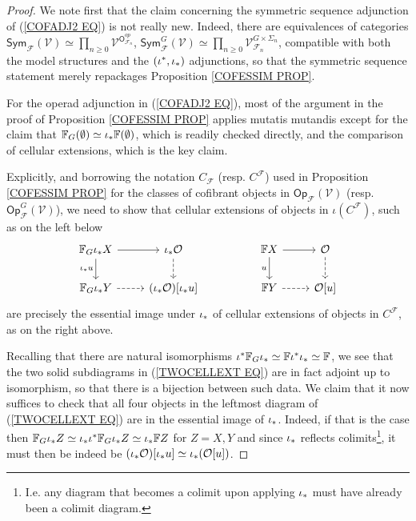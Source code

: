 \documentclass[a4paper,10pt]{article}%
\begin{document}
\begin{proof}
We note first that the claim concerning the symmetric sequence adjunction of (\ref{COFADJ2 EQ})
is not really new. Indeed, there are equivalences of categories
$
\mathsf{Sym}_{\mathcal{F}}(\mathcal{V})
\simeq \prod_{n \geq 0}
\mathcal{V}^{\mathsf{O}^{op}_{\mathcal{F}_n}}
$,
$
\mathsf{Sym}^G_{\mathcal{F}}(\mathcal{V})
\simeq \prod_{n \geq 0}
\mathcal{V}_{\mathcal{F}_n}^{G \times \Sigma_n}
$,
compatible with both the model structures and the $(\iota^{\**},\iota_{\**})$ adjunctions, 
so that the symmetric sequence statement merely repackages 
Proposition \ref{COFESSIM PROP}.

For the operad adjunction in (\ref{COFADJ2 EQ}),
most of the argument in the proof of
Proposition \ref{COFESSIM PROP}
applies mutatis mutandis
except for the claim that 
$\mathbb{F}_G (\emptyset) \simeq \iota_{\**} \mathbb{F} (\emptyset)$, which is readily checked directly, 
and the comparison of cellular extensions,
which is the key claim.


Explicitly, and borrowing the notation
$C_{\mathcal{F}}$ (resp. $C^{\mathcal{F}}$) used in Proposition \ref{COFESSIM PROP} for the 
classes of cofibrant objects in 
$\mathsf{Op}_{\mathcal{F}}(\mathcal{V})$ 
(resp. $\mathsf{Op}_{\mathcal{F}}^G(\mathcal{V})$),
we need to show that cellular extensions of objects in 
$\iota(C^{\mathcal{F}})$, such as on the left below
\begin{equation}\label{TWOCELLEXT EQ}
\begin{tikzcd}
	\mathbb{F}_G \iota_{\**} X \ar{d}[swap]{\iota_{\**}u} \ar{r} &
	\iota_{\**} \mathcal{O} \ar[dashed]{d} & &
	\mathbb{F} X \ar{d}[swap]{u} \ar{r} &
	\mathcal{O} \ar[dashed]{d}
\\
	\mathbb{F}_G \iota_{\**} Y  \ar[dashed]{r}&
	(\iota_{\**} \mathcal{O})[\iota_{\**} u]& &
	\mathbb{F} Y \ar[dashed]{r}&
	\mathcal{O}[u]
\end{tikzcd}
\end{equation}
are precisely the essential image under $\iota_{\**}$ of cellular extensions of objects in $C^{\mathcal{F}}$, as on the right above.


Recalling that there are natural isomorphisms 
$\iota^{\**} \mathbb{F}_{G} \iota_{\**}
\simeq  \mathbb{F} \iota^{\**} \iota_{\**} \simeq \mathbb{F}$, we see that the two solid subdiagrams in 
(\ref{TWOCELLEXT EQ})
are in fact adjoint up to isomorphism, so that there is a bijection between such data. 
We claim that it now suffices to check that all four objects in the leftmost diagram of (\ref{TWOCELLEXT EQ})
are in the essential image of $\iota_{\**}$.
Indeed, if that is the case then
$\mathbb{F}_G \iota_{\**} Z \simeq 
\iota_{\**} \iota^{\**} \mathbb{F}_G \iota_{\**} Z \simeq
\iota_{\**} \mathbb{F} Z
$ for $Z=X,Y$
and since $\iota_{\**}$ reflects colimits\footnote{I.e. any diagram that becomes a colimit upon applying $\iota_{\**}$ must have already been a colimit diagram.},
 it must then be
indeed be 
$(\iota_{\**} \mathcal{O})[\iota_{\**} u]
\simeq \iota_{\**} (\mathcal{O}[u])$.



\end{proof}
\end{document}
